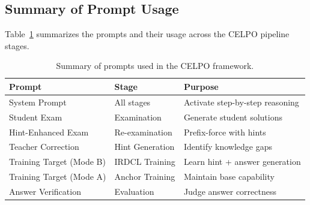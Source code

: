\subsection{Summary of Prompt Usage}\label{app:prompt-summary}

Table~\ref{tab:prompt-summary} summarizes the prompts and their usage across the CELPO pipeline stages.

\begin{table}[htbp]
\centering
\caption{Summary of prompts used in the CELPO framework.}
\label{tab:prompt-summary}
\small
\begin{tabular}{lll}
\toprule
\textbf{Prompt} & \textbf{Stage} & \textbf{Purpose} \\
\midrule
System Prompt & All stages & Activate step-by-step reasoning \\
Student Exam & Examination & Generate student solutions \\
Hint-Enhanced Exam & Re-examination & Prefix-force with hints \\
Teacher Correction & Hint Generation & Identify knowledge gaps \\
Training Target (Mode B) & IRDCL Training & Learn hint + answer generation \\
Training Target (Mode A) & Anchor Training & Maintain base capability \\
Answer Verification & Evaluation & Judge answer correctness \\
\bottomrule
\end{tabular}
\end{table}
